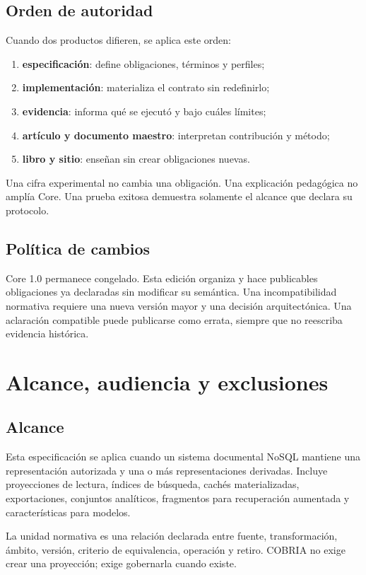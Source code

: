 \documentclass[11pt,letterpaper]{article}
\begin{document}
\subsection{Orden de autoridad}
Cuando dos productos difieren, se aplica este orden:
\begin{enumerate}
\item \textbf{especificación}: define obligaciones, términos y perfiles;
\item \textbf{implementación}: materializa el contrato sin redefinirlo;
\item \textbf{evidencia}: informa qué se ejecutó y bajo cuáles límites;
\item \textbf{artículo y documento maestro}: interpretan contribución y método;
\item \textbf{libro y sitio}: enseñan sin crear obligaciones nuevas.
\end{enumerate}
Una cifra experimental no cambia una obligación. Una explicación pedagógica no amplía
Core. Una prueba exitosa demuestra solamente el alcance que declara su protocolo.

\subsection{Política de cambios}
Core 1.0 permanece congelado. Esta edición organiza y hace publicables obligaciones ya
declaradas sin modificar su semántica. Una incompatibilidad normativa requiere una nueva
versión mayor y una decisión arquitectónica. Una aclaración compatible puede publicarse
como errata, siempre que no reescriba evidencia histórica.

\section{Alcance, audiencia y exclusiones}
\subsection{Alcance}
Esta especificación se aplica cuando un sistema documental NoSQL mantiene una
representación autorizada y una o más representaciones derivadas. Incluye proyecciones
de lectura, índices de búsqueda, cachés materializadas, exportaciones, conjuntos
analíticos, fragmentos para recuperación aumentada y características para modelos.

La unidad normativa es una relación declarada entre fuente, transformación, ámbito,
versión, criterio de equivalencia, operación y retiro. COBRIA no exige crear una
proyección; exige gobernarla cuando existe.
\end{document}
